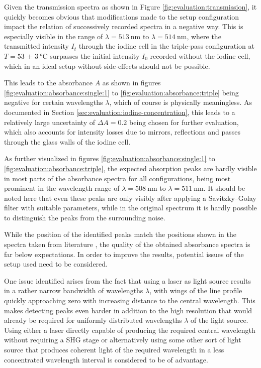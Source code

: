 Given the transmission spectra as shown in Figure \ref{fig:evaluation:transmission}, it quickly becomes obvious that modifications made to the setup configuration impact the relation of successively recorded spectra in a negative way. This is especially visible in the range of $\lambda = \SI{513}{\nm}$ to $\lambda = \SI{514}{\nm}$, where the transmitted intensity $I_t$ through the iodine cell in the triple-pass configuration at $T = \SI{53(3)}{\celsius}$ surpasses the initial intensity $I_0$ recorded without the iodine cell, which in an ideal setup without side-effects should not be possible.

This leads to the absorbance $A$ as shown in figures \ref{fig:evaluation:absorbance:single:1} to \ref{fig:evaluation:absorbance:triple} being negative for certain wavelengths $\lambda$, which of course is physically meaningless. As documented in Section \ref{sec:evaluation:iodine-concentration}, this leads to a relatively large uncertainty of $\Delta A = 0.2$ being chosen for further evaluation, which also accounts for intensity losses due to mirrors, reflections and passes through the glass walls of the iodine cell.

As further visualized in figures \ref{fig:evaluation:absorbance:single:1} to \ref{fig:evaluation:absorbance:triple}, the expected absorption peaks are hardly visible in most parts of the absorbance spectra for all configurations, being most prominent in the wavelength range of $\lambda = \SI{508}{\nm}$ to $\lambda = \SI{511}{\nm}$. It should be noted here that even these peaks are only visibly after applying a Savitzky–Golay filter with suitable parameters, while in the original spectrum it is hardly possible to distinguish the peaks from the surrounding noise.

While the position of the identified peaks match the positions shown in the spectra taken from literature \cite{Iodine}, the quality of the obtained absorbance spectra is far below expectations. In order to improve the results, potential issues of the setup used need to be considered.

One issue identified arises from the fact that using a laser as light source results in a rather narrow bandwidth of wavelengths $\lambda$, with wings of the line profile quickly approaching zero with increasing distance to the central wavelength. This makes detecting peaks even harder in addition to the high resolution that would already be required for uniformly distributed wavelengths $\lambda$ of the light source. Using either a laser directly capable of producing the required central wavelength without requiring a SHG stage or alternatively using some other sort of light source that produces coherent light of the required wavelength in a less concentrated wavelength interval is considered to be of advantage.

